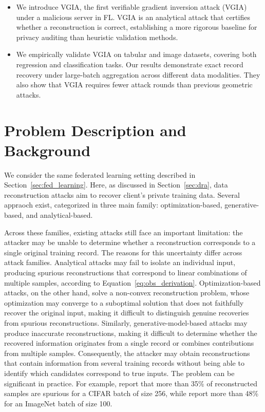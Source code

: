 \begin{itemize}
    
    \item We introduce VGIA, the first verifiable gradient inversion attack (VGIA) under a malicious server in FL. VGIA is an analytical  attack that  certifies whether a reconstruction is correct, establishing a more rigorous baseline for privacy auditing than heuristic validation methods.

    \item We empirically validate VGIA on  tabular and image datasets, covering both regression and classification tasks. Our results demonstrate exact record recovery under large-batch aggregation across different data modalities. They also show that VGIA requires fewer attack rounds than previous geometric attacks.
\end{itemize}

\section{Problem Description and Background}\label{sec:vgia_background}

We consider the same federated learning setting described in Section~\ref{sec:fed_learning}. Here, as discussed in Section~\ref{sec:dra}, data reconstruction attacks aim to recover client's private training data. Several appraoch exist, categorized in three main family: optimization-based, generative-based, and analytical-based. 


Across these families, existing attacks still face an important limitation: the attacker may be unable to determine whether a reconstruction corresponds to a single original training record. The reasons for this uncertainty differ across attack families. Analytical attacks may fail to isolate an individual input, producing spurious reconstructions that correspond to linear combinations of multiple samples, according to Equation~\ref{eq:obs_derivation}. Optimization-based attacks, on the other hand, solve a non-convex reconstruction problem, whose optimization may converge to a suboptimal solution that does not faithfully recover the original input, making it difficult to distinguish genuine recoveries from spurious reconstructions. Similarly, generative-model-based attacks may produce inaccurate reconstructions, making it difficult to determine whether the recovered information originates from a single record or combines contributions from multiple samples. Consequently, the attacker may obtain reconstructions that contain information from several training records without being able to identify which candidates correspond to true inputs. The problem can be significant in practice. For example,  report that more than 35\% of reconstructed samples are spurious for a CIFAR batch of size 256, while  report more than 48\% for an ImageNet batch of size 100.


